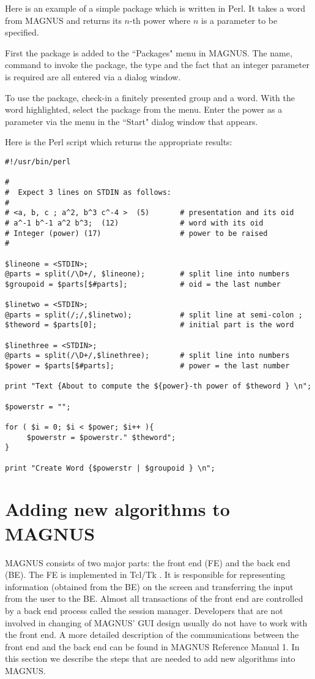 \documentclass[12pt]{article}
\def\magnus{MAGNUS }
\def\nsmagnus{MAGNUS}
\begin{document}
Here is an example of a simple package which is written in Perl.
It takes a word from \magnus and returns its $n$-th power where
$n$ is a parameter to be specified.

First the package is added to the ``Packages" menu in \nsmagnus. The name,
command to invoke the package, the type and the fact that an integer
parameter is required are all entered via a dialog window.

To use the package, check-in a finitely presented group and a word.
With the word highlighted, select the package from the menu. Enter
the power as a parameter via the menu in the ``Start" dialog window
that appears.

Here is the Perl script which returns the appropriate results:

\begin{verbatim}
#!/usr/bin/perl

#
#  Expect 3 lines on STDIN as follows:
#
# <a, b, c ; a^2, b^3 c^-4 >  (5)       # presentation and its oid
# a^-1 b^-1 a^2 b^3;  (12)              # word with its oid
# Integer (power) (17)                  # power to be raised
#

$lineone = <STDIN>;
@parts = split(/\D+/, $lineone);        # split line into numbers
$groupoid = $parts[$#parts];            # oid = the last number

$linetwo = <STDIN>;
@parts = split(/;/,$linetwo);           # split line at semi-colon ;
$theword = $parts[0];                   # initial part is the word

$linethree = <STDIN>;
@parts = split(/\D+/,$linethree);       # split line into numbers
$power = $parts[$#parts];               # power = the last number

print "Text {About to compute the ${power}-th power of $theword } \n";

$powerstr = "";

for ( $i = 0; $i < $power; $i++ ){
     $powerstr = $powerstr." $theword";
}

print "Create Word {$powerstr | $groupoid } \n";
\end{verbatim}




\section{Adding new algorithms to \magnus}


\magnus consists of two major parts: the front end (FE) and  the back end (BE).
The FE is implemented in Tcl/Tk . It is responsible for representing
information
(obtained from the BE) on the screen and transferring the input from
the user to the BE.
Almost all transactions of the front end are controlled by a back end process
called the session manager. Developers  that are not involved in changing of
\nsmagnus' GUI design
usually do not have to work with the front end. A more detailed
description of the
communications between the front end and the back end can be found in \magnus
Reference Manual 1. In this section we describe the steps that are
needed to add new  algorithms into \nsmagnus.
\end{document}
